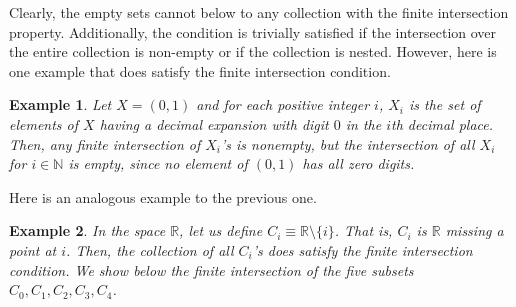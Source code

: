 \documentclass{article}
\newtheorem{example}{Example}[section]
\theoremstyle{remark}
\theoremstyle{definition}
\begin{document}
Clearly, the empty sets cannot below to any collection with the finite intersection property. Additionally, the condition is trivially satisfied if the intersection over the entire collection is non-empty or if the collection is nested. However, here is one example that does satisfy the finite intersection condition. 

\begin{example}
Let $X = (0,1)$ and for each positive integer $i$, $X_i$ is the set of elements of $X$ having a decimal expansion with digit $0$ in the $i$th decimal place. Then, any finite intersection of $X_i$'s is nonempty, but the intersection of all $X_i$ for $i \in \mathbb{N}$ is empty, since no element of $(0,1)$ has all zero digits. 
\end{example}

Here is an analogous example to the previous one. 
\begin{example}
In the space $\mathbb{R}$, let us define $C_i \equiv \mathbb{R} \setminus \{i\}$. That is, $C_i$ is $\mathbb{R}$ missing a point at $i$. Then, the collection of all $C_i$'s does satisfy the finite intersection condition. We show below the finite intersection of the five subsets $C_0, C_1, C_2, C_3, C_4$. 
\begin{center}
\end{center}
\end{example}
\end{document}
